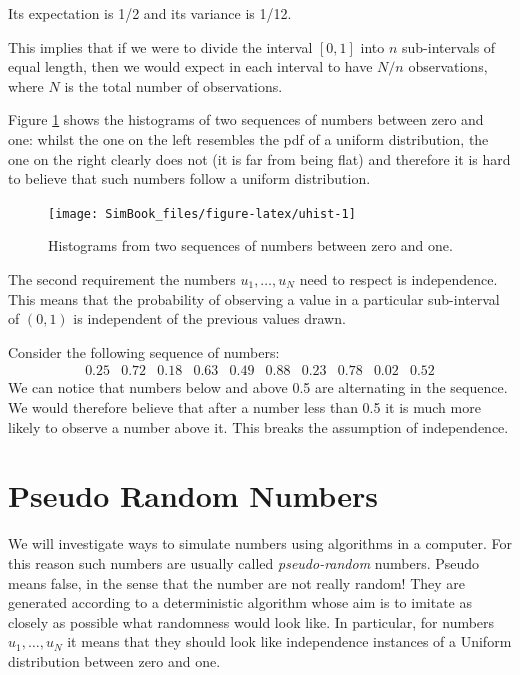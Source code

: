 \documentclass[
]{book}
\begin{document}
Its expectation is 1/2 and its variance is 1/12.

This implies that if we were to divide the interval \([0,1]\) into \(n\) sub-intervals of equal length, then we would expect in each interval to have \(N/n\) observations, where \(N\) is the total number of observations.

Figure \ref{fig:uhist} shows the histograms of two sequences of numbers between zero and one: whilst the one on the left resembles the pdf of a uniform distribution, the one on the right clearly does not (it is far from being flat) and therefore it is hard to believe that such numbers follow a uniform distribution.

\begin{figure}

{\centering \texttt{[image: SimBook\_files/figure-latex/uhist-1]} 

}

\caption{Histograms from two sequences of numbers between zero and one.}\label{fig:uhist}
\end{figure}

The second requirement the numbers \(u_1,\dots,u_N\) need to respect is independence. This means that the probability of observing a value in a particular sub-interval of \((0,1)\) is independent of the previous values drawn.

Consider the following sequence of numbers:
\[
\begin{array}{cccccccccc}
0.25 & 0.72 & 0.18 & 0.63 & 0.49 & 0.88 & 0.23 & 0.78 & 0.02 & 0.52
\end{array}
\]
We can notice that numbers below and above 0.5 are alternating in the sequence. We would therefore believe that after a number less than 0.5 it is much more likely to observe a number above it. This breaks the assumption of independence.

\hypertarget{pseudo-random-numbers}{%
\section{Pseudo Random Numbers}\label{pseudo-random-numbers}}

We will investigate ways to simulate numbers using algorithms in a computer. For this reason such numbers are usually called \emph{pseudo-random} numbers. Pseudo means false, in the sense that the number are not really random! They are generated according to a deterministic algorithm whose aim is to imitate as closely as possible what randomness would look like. In particular, for numbers \(u_1,\dots,u_N\) it means that they should look like independence instances of a Uniform distribution between zero and one.
\end{document}
